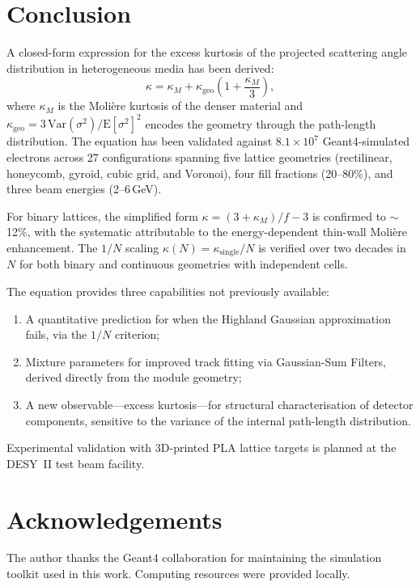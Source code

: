 \documentclass[final,5p,times,twocolumn]{elsarticle}
\begin{document}
\section{Conclusion}
\label{sec:conclusion}

A closed-form expression for the excess kurtosis of the projected scattering angle distribution in heterogeneous media has been derived:
\begin{equation}
  \kappa = \kappa_M + \kappa_{\mathrm{geo}}\!\left(1+\frac{\kappa_M}{3}\right),
  \label{eq:conclusion}
\end{equation}
where $\kappa_M$ is the Moli\`{e}re kurtosis of the denser material and $\kappa_{\mathrm{geo}} = 3\,\mathrm{Var}(\sigma^2)/\mathrm{E}[\sigma^2]^2$ encodes the geometry through the path-length distribution.  The equation has been validated against $8.1\times10^7$ Geant4-simulated electrons across 27 configurations spanning five lattice geometries (rectilinear, honeycomb, gyroid, cubic grid, and Voronoi), four fill fractions (20--80\%), and three beam energies (2--6\,GeV).

For binary lattices, the simplified form $\kappa = (3+\kappa_M)/f - 3$ is confirmed to $\sim$12\%, with the systematic attributable to the energy-dependent thin-wall Moli\`{e}re enhancement.  The $1/N$ scaling $\kappa(N) = \kappa_{\mathrm{single}}/N$ is verified over two decades in~$N$ for both binary and continuous geometries with independent cells.

The equation provides three capabilities not previously available:
\begin{enumerate}
  \item A quantitative prediction for when the Highland Gaussian approximation fails, via the $1/N$ criterion;
  \item Mixture parameters for improved track fitting via Gaussian-Sum Filters, derived directly from the module geometry;
  \item A new observable---excess kurtosis---for structural characterisation of detector components, sensitive to the variance of the internal path-length distribution.
\end{enumerate}

Experimental validation with 3D-printed PLA lattice targets is planned at the DESY~II test beam facility.

\section*{Acknowledgements}

The author thanks the Geant4 collaboration for maintaining the simulation toolkit used in this work.  Computing resources were provided locally.



\end{document}
